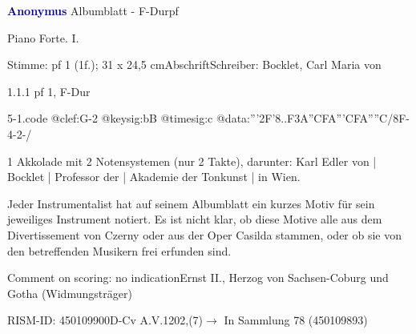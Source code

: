 \documentclass[a4paper, twocolumn, 11pt]{book}
\begin{document}
\par \vspace{16pt} \textcolor{darkblue}{\textbf{Anonymus  }}\hfillplus{[5]}\newline Albumblatt - F-Dur\newline pf
\par \begin{itshape}[heading:] Piano Forte. I.\end{itshape} 
\par \textcolor{darkblue}{}  Stimme: pf 1  (1f.); 31 x 24,5 cm\newline Abschrift\newline Schreiber: Bocklet, Carl Maria von
\par 1.1.1  pf 1, F-Dur  
\begin{filecontents*}{5-1.code}
@clef:G-2
@keysig:bB
@timesig:c
@data:'''2F'{8..F3A}{''CFA'''CFA''''C}/8F-4-2-/
\end{filecontents*}
\newline %
\par 1 Akkolade mit 2 Notensystemen (nur 2 Takte), darunter: Karl Edler von | Bocklet | Professor der | Akademie der Tonkunst | in Wien.
\par Jeder Instrumentalist hat auf seinem Albumblatt ein kurzes Motiv für sein jeweiliges Instrument notiert. Es ist nicht klar, ob diese Motive alle aus dem {\textquotedbl}Divertissement{\textquotedbl} von Czerny oder aus der Oper {\textquotedbl}Casilda{\textquotedbl} stammen, oder ob sie von den betreffenden Musikern frei erfunden sind.
\par Comment on scoring: no indication\newline Ernst II., Herzog von Sachsen-Coburg und Gotha  (Widmungsträger)
\par RISM-ID: 450109900\newline D-Cv  A.V.1202,(7)\newline $\rightarrow$ In Sammlung 78 (450109893)
      
\end{document}
